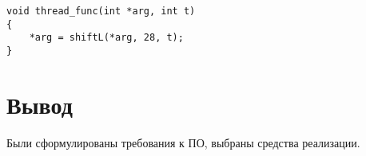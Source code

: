 \begin{lstlisting}[caption=Функция шифрования в потоке]
void thread_func(int *arg, int t)
{
    *arg = shiftL(*arg, 28, t);
}
\end{lstlisting}

\section{Вывод}
Были сформулированы требования к ПО, выбраны средства реализации.
